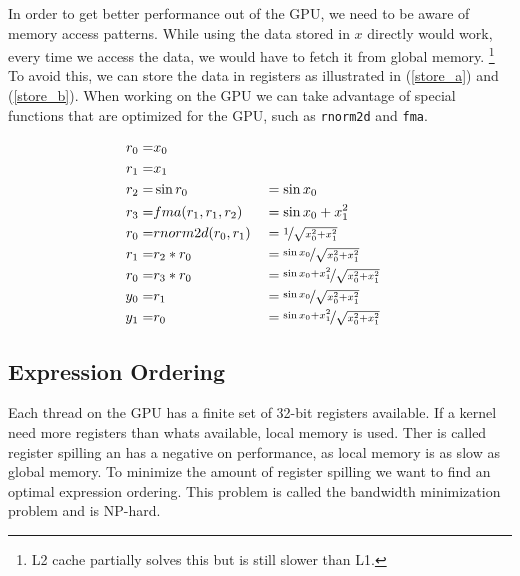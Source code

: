 In order to get better performance out of the GPU, we need to be aware of memory access patterns.
While using the data stored in $x$ directly would work, every time we access the data, we would have to fetch it from global memory.
\footnote{L2 cache partially solves this but is still slower than L1.}
To avoid this, we can store the data in registers as illustrated in (\ref{store_a}) and (\ref{store_b}).
When working on the GPU we can take advantage of special functions that are optimized for the GPU, such as \texttt{rnorm2d} and \texttt{fma}.

\begin{align}
    r_0 = & x_0                   \label{store_a}                                                      \\
    r_1 = & x_1                   \label{store_b}                                                      \\
    r_2 = & \sin r_0                              &  & = \sin x_0                                      \\
    r_3 = & fma(r_1, r_1, r_2)                    &  & =\sin x_0+x_1^2                                 \\
    r_0 = & rnorm2d(r_0, r_1)                     &  & =\nicefrac{1}{\sqrt{x_0^2+x_1^2}}               \\
    r_1 = & r_2*r_0                               &  & =\nicefrac{\sin x_0}{\sqrt{x_0^2+x_1^2}}        \\
    r_0 = & r_3*r_0                               &  & =\nicefrac{\sin x_0+x_1^2}{\sqrt{x_0^2+x_1^2}}  \\
    y_0 = & r_1                                   &  & = \nicefrac{\sin x_0}{\sqrt{x_0^2+x_1^2}}       \\
    y_1 = & r_0                                   &  & = \nicefrac{\sin x_0+x_1^2}{\sqrt{x_0^2+x_1^2}} \\
\end{align}

\subsection{Expression Ordering}
Each thread on the GPU has a finite set of 32-bit registers available.
If a kernel need more registers than whats available, local memory is used.
Ther is called register spilling an has a negative on performance, as local memory is as slow as global memory.
To minimize the amount of register spilling we want to find an optimal expression ordering.
This problem is called the bandwidth minimization problem and is NP-hard.

